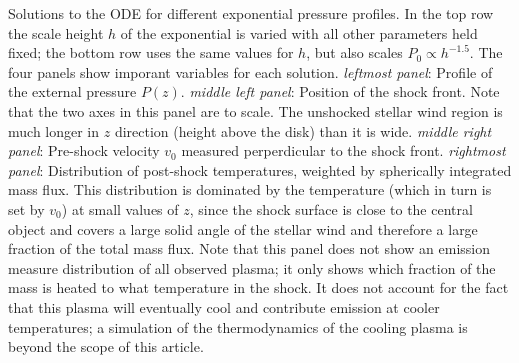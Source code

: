 \label{fig:p_ext}
Solutions to the ODE for different exponential pressure profiles. In the top row the scale height $h$ of the exponential is varied with all other parameters held fixed; the bottom row uses the same values for $h$, but also scales $P_0\propto h^{-1.5}$.
The four panels show imporant variables for each solution. 
\emph{leftmost panel}: Profile of the external pressure $P(z)$. 
\emph{middle left panel}: Position of the shock front. Note that the two axes in this panel are to scale. The unshocked stellar wind region is much longer in $z$ direction (height above the disk) than it is wide. 
\emph{middle right panel}: Pre-shock velocity $v_0$ measured perperdicular to the shock front. 
\emph{rightmost panel}: Distribution of post-shock temperatures, weighted by spherically integrated mass flux. This distribution is dominated by the temperature (which in turn is set by $v_0$) at small values of $z$, since the shock surface is close to the central object and covers a large solid angle of the stellar wind and therefore a large fraction of the total mass flux. Note that this panel does not show an emission measure distribution of all observed plasma; it only shows which fraction of the mass is heated to what temperature in the shock. It does not account for the fact that this plasma will eventually cool and contribute emission at cooler temperatures; a simulation of the thermodynamics of the cooling plasma is beyond the scope of this article.